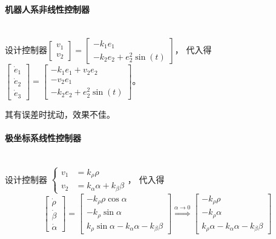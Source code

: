 \documentclass[
12pt, %
a4paper, 
oneside, %
headinclude,footinclude, %
]{scrartcl}
\begin{document}
\paragraph{机器人系非线性控制器}~\\

设计控制器$ \begin{bmatrix} v_1 \\ v_2 \end{bmatrix} = \begin{bmatrix} -k_1 e_1 \\ -k_2 e_2 + e_2^2 \sin(t) \end{bmatrix} $，
代入得$ \begin{bmatrix} \dot{e}_1 \\ \dot{e}_2 \\ \dot{e}_3 \end{bmatrix} = \begin{bmatrix} -k_1 e_1 + v_2 e_2 \\ -v_2 e_1 \\ -k_2 e_2 + e_2^2 \sin(t) \end{bmatrix} $。

其有误差时扰动，效果不佳。
\paragraph{极坐标系线性控制器}~\\

设计控制器
$ 
\begin{cases}
v_1 &= k_\rho \rho \\
v_2 &= k_\alpha \alpha + k_\beta \beta
\end{cases}
$，
代入得
$$
\begin{bmatrix} \dot{\rho} \\ \dot{\beta} \\ \dot{\alpha} \end{bmatrix} = \begin{bmatrix} -k_\rho \rho \cos\alpha \\ -k_\rho \sin\alpha \\ k_\rho \sin\alpha - k_\alpha \alpha - k_\beta \beta \end{bmatrix}
\overset{\alpha \to 0}{\Longrightarrow}
\begin{bmatrix} -k_\rho \rho \\ -k_\rho \alpha \\ k_\rho \alpha - k_\alpha \alpha - k_\beta \beta \end{bmatrix}
$$
\end{document}

